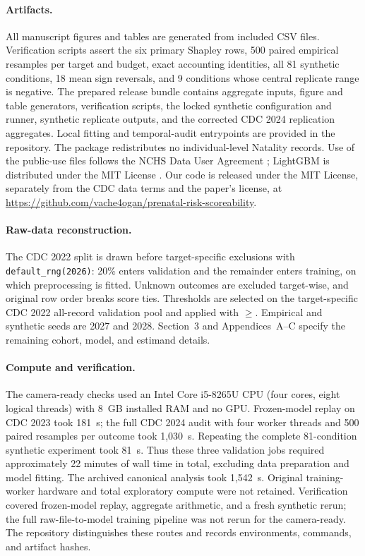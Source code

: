 \documentclass{article}
\begin{document}
\paragraph{Artifacts.}

All manuscript figures and tables are generated from included CSV files.
Verification scripts assert the six primary Shapley rows, 500 paired empirical
resamples per target and budget, exact accounting identities, all 81 synthetic
conditions, 18 mean sign reversals, and 9 conditions whose central replicate
range is negative. The prepared release bundle contains aggregate inputs,
figure and table generators, verification scripts, the locked synthetic
configuration and runner, synthetic replicate outputs, and the corrected
CDC 2024 replication aggregates. Local fitting and temporal-audit entrypoints
are provided in the repository. The package redistributes no individual-level Natality
records. Use of the public-use files follows the NCHS Data User Agreement
\citep{cdcDataAgreement}; LightGBM is distributed under the MIT License
\citep{lightgbmRepo}. Our code is released under the MIT License, separately
from the CDC data terms and the paper's license, at
\url{https://github.com/vache4ogan/prenatal-risk-scoreability}.

\paragraph{Raw-data reconstruction.}
The CDC 2022 split is drawn before target-specific exclusions with
\texttt{default\_rng(2026)}: 20\% enters validation and the remainder enters
training, on which preprocessing is fitted. Unknown outcomes are excluded
target-wise, and original row order breaks score ties. Thresholds are selected
on the target-specific CDC 2022 all-record validation pool and applied with
$\geq$. Empirical and synthetic seeds are 2027 and 2028. Section~3 and
Appendices~A--C specify the remaining cohort, model, and estimand details.

\paragraph{Compute and verification.}
The camera-ready checks used an Intel Core i5-8265U CPU (four cores, eight
logical threads) with 8~GB installed RAM and no GPU. Frozen-model replay on
CDC 2023 took 181~s; the full CDC 2024 audit with four worker threads and
500 paired resamples per outcome took 1,030~s. Repeating the complete
81-condition synthetic experiment took 81~s. Thus these three validation
jobs required approximately 22 minutes of wall time in total, excluding data
preparation and model fitting. The archived canonical analysis took
1,542~s. Original training-worker hardware and total exploratory compute
were not retained. Verification covered frozen-model replay, aggregate
arithmetic, and a fresh synthetic rerun; the full raw-file-to-model training
pipeline was not rerun for the camera-ready. The repository distinguishes
these routes and records environments, commands, and artifact hashes.

\clearpage

\end{document}
